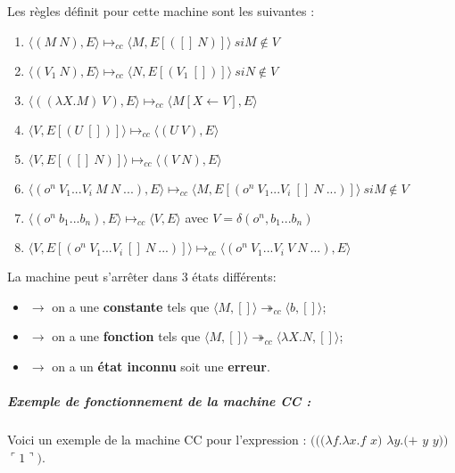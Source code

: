 \documentclass[10pt,a4paper]{article}
\begin{document}
				
				Les règles définit pour cette machine sont les suivantes :
				\begin{enumerate}
		
					\item $\langle(M~N),E\rangle \longmapsto_{cc} \langle M,E[([]~N)]\rangle~si M \notin V$
					
					\item $\langle(V_{1}~N),E\rangle \longmapsto_{cc}  \langle N,E[(V_{1}~[])]\rangle~si N \notin V$
					
					\item $\langle((\lambda X.M)~V),E\rangle \longmapsto_{cc} \langle M[X\longleftarrow V],E\rangle$
					
					\item $\langle V,E[(U~[])]\rangle \longmapsto_{cc} \langle(U~V),E\rangle$
					 
					\item $\langle V,E[([]~N)]\rangle \longmapsto_{cc} \langle(V~N),E\rangle$ 
					
					\item $\langle(o^{n}~V_{1}...V_{i}~M~N~...),E\rangle \longmapsto_{cc}  
					\langle M,E[(o^{n}~V_{1}...V_{i}~[]~N~...)]\rangle~ si M \notin V$
					
					\item $\langle(o^{n}~b_{1}...b_{n}),E\rangle \longmapsto_{cc}  \langle V,E\rangle$ avec $V = \delta(o^{n},b_{1}...b_{n})$ 
					
					\item $\langle V,E[(o^{n}~V_{1}...V_{i}~[]~N~...)]\rangle \longmapsto_{cc} \langle(o^{n}~V_{1}...V_{i}~V~N ~...),E\rangle$ 
				\end{enumerate}
				\bigbreak
				
				
				La machine peut s'arrêter dans 3 états différents:
				\begin{itemize}
					\item[]$\longrightarrow$ on a une \textbf{constante} tels que $\langle M,[]\rangle \twoheadrightarrow_{cc} \langle b,[]\rangle$;
					\item[]$\longrightarrow$ on a une \textbf{fonction} tels que $\langle M,[]\rangle \twoheadrightarrow_{cc} \langle\lambda X.N,[]\rangle$;
					\item[]$\longrightarrow$ on a un \textbf{état inconnu} soit une \textbf{erreur}.
				\end{itemize}
				\bigbreak
				
				
				\subparagraph{Exemple de fonctionnement de la machine CC :}
				Voici un exemple de la machine CC pour l'expression : 
				\smallbreak 
				$(((\lambda f.\lambda x.f$ $x)$ $\lambda y.(+$ $y$ $y))$ $\ulcorner 1\urcorner)$.
				
\end{document}
